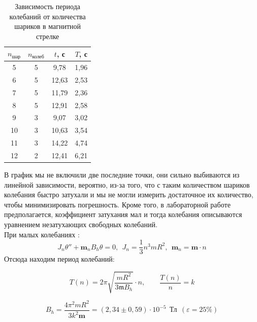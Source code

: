 \documentclass[a4paper, 12pt]{article}
\begin{document}
	\begin{table}[h]
		\centering
		\begin{tabular}{|c|c|c|c|}
			\hline  $n_{\text{шар}}$ & $n_{\text{колеб}}$ & $t$, с & $T$, с \\ \hline
			5 & 5 &  9,78 & 1,96 \\ \hline
			6  & 5 &  12,63 & 2,53 \\ \hline
			7  & 5 &  11,79 & 2,36  \\ \hline
			8  & 5 &  12,91 & 2,58  \\ \hline
			9  & 3 &  9,07 & 3,02 \\ \hline
			10  & 3 &  10,63 & 3,54  \\ \hline
			11  & 3 & 14,22 & 4,74 \\ \hline
			12 & 2 & 12,41 & 6,21 \\ \hline
		\end{tabular}
		\caption{Зависимость периода колебаний от количества шариков в магнитной стрелке}
	\end{table}
	
	В график мы не включили две последние точки, они сильно выбиваются из линейной зависимости, вероятно, из-за того, что с таким количеством шариков колебания быстро затухали и мы не могли измерить достаточное их количество, чтобы минимизировать погрешность. Кроме того, в лабораторной работе предполагается, коэффициент затухания мал и тогда колебания описываются уравнением незатухающих свободных колебаний.\\
	При малых колебаниях : 
	\[J_n\theta'' + \mathbf{m}_nB_h \theta = 0, \ \ J_n = \frac{1}{3}n^3mR^2, \ \ \mathbf{m}_n = \mathbf{m} \cdot n  \]
	Отсюда находим период колебаний: 
	
	\begin{equation*}
		T(n) = 2\pi \sqrt{\frac{mR^2}{3 \mathfrak{m} B_{h}}} \cdot n, \quad \quad \frac{T(n)}{n} = k
	\end{equation*}
	
	\[B_h = \frac{4\pi^2 mR^2}{3k^2\mathbf{m}} = (2,34 \pm 0,59) \cdot 10^{-5} \ \ \text{Тл} \ \ (\varepsilon = 25\%)\]
	
\end{document}
